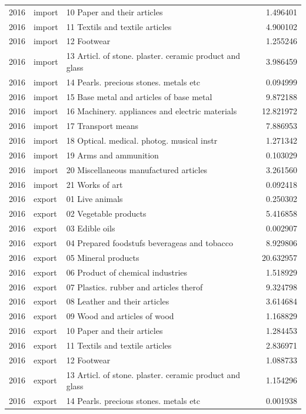 \begin{tabular}{rllr}
2016 & import & 10 Paper and their articles & 1.496401 \\
2016 & import & 11 Textils and textile articles & 4.900102 \\
2016 & import & 12 Footwear & 1.255246 \\
2016 & import & 13 Articl. of stone. plaster. ceramic product and glass & 3.986459 \\
2016 & import & 14 Pearls. precious stones. metals etc & 0.094999 \\
2016 & import & 15 Base metal and articles of base metal & 9.872188 \\
2016 & import & 16 Machinery. appliances and electric materials & 12.821972 \\
2016 & import & 17 Transport means & 7.886953 \\
2016 & import & 18 Optical. medical. photog. musical instr & 1.271342 \\
2016 & import & 19 Arms and ammunition & 0.103029 \\
2016 & import & 20 Miscellaneous manufactured articles & 3.261560 \\
2016 & import & 21 Works of art & 0.092418 \\
2016 & export & 01 Live animals & 0.250302 \\
2016 & export & 02 Vegetable products & 5.416858 \\
2016 & export & 03 Edible oils & 0.002907 \\
2016 & export & 04 Prepared foodstufs beverageas and tobacco & 8.929806 \\
2016 & export & 05 Mineral products & 20.632957 \\
2016 & export & 06 Product of chemical industries & 1.518929 \\
2016 & export & 07 Plastics. rubber and articles therof & 9.324798 \\
2016 & export & 08 Leather and their articles & 3.614684 \\
2016 & export & 09 Wood and articles of wood & 1.168829 \\
2016 & export & 10 Paper and their articles & 1.284453 \\
2016 & export & 11 Textils and textile articles & 2.836971 \\
2016 & export & 12 Footwear & 1.088733 \\
2016 & export & 13 Articl. of stone. plaster. ceramic product and glass & 1.154296 \\
2016 & export & 14 Pearls. precious stones. metals etc & 0.001938 \\

\end{tabular}
